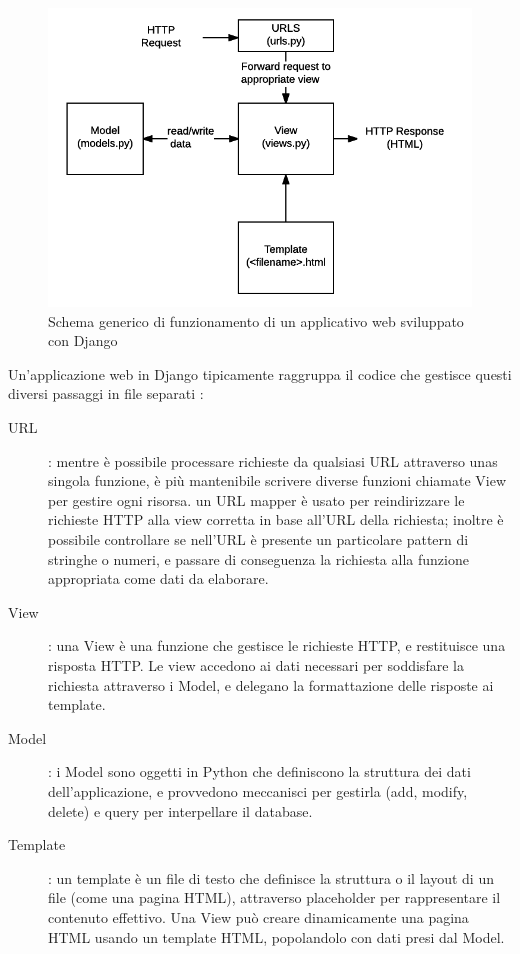 \begin{figure}[ht!]
    \centering
	\includegraphics[scale=0.9]{images/Django_doc.png}
	\caption{Schema generico di funzionamento di un applicativo web sviluppato con Django}
\end{figure}

Un'applicazione web in Django tipicamente raggruppa il codice che gestisce questi diversi passaggi in file separati \cite{mdn-django-documentation}:
\begin{description}
	\item[URL]: mentre è possibile processare richieste da qualsiasi URL attraverso unas singola funzione, è più mantenibile scrivere diverse funzioni chiamate
	View per gestire ogni risorsa. un URL mapper è usato per reindirizzare le richieste HTTP alla view corretta in base all'URL della richiesta; inoltre è 
	possibile controllare se nell'URL è presente un particolare pattern di stringhe o numeri, e passare di conseguenza la richiesta alla funzione appropriata
	come dati da elaborare.
	\item[View]: una View è una funzione che gestisce le richieste HTTP, e restituisce una risposta HTTP. Le view accedono ai dati necessari per soddisfare la 
	richiesta attraverso i Model, e delegano la formattazione delle risposte ai template. 
	\item[Model]: i Model sono oggetti in Python che definiscono la struttura dei dati dell'applicazione, e provvedono meccanisci per gestirla (add, modify, 
	delete) e query per interpellare il database.
	\item[Template]: un template è un file di testo che definisce la struttura o il layout di un file (come una pagina HTML), attraverso placeholder per 
	rappresentare il contenuto effettivo. Una View può creare dinamicamente una pagina HTML usando un template HTML, popolandolo con dati presi dal Model. 
\end{description}

